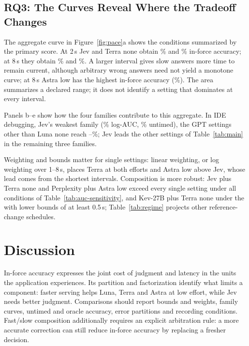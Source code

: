 \documentclass[11pt]{article}
\begin{document}
\subsection{RQ3: The Curves Reveal Where the Tradeoff Changes}
\label{sec:rq3}
The aggregate curve in Figure~\ref{fig:pace}a shows the conditions summarized by the primary score.
At 2\,s Jev and Terra none obtain \JevCommonTwo\% and \TerraNoneCommonTwo\% in-force accuracy; at 8\,s they obtain \JevCommonEight\% and \TerraNoneCommonEight\%.
A larger interval gives slow answers more time to remain current, although arbitrary wrong answers need not yield a monotone curve; at 8\,s Astra low has the highest in-force accuracy (\AstraCommonEight\%).
The area summarizes a declared range; it does not identify a setting that dominates at every interval.

Panels b--e show how the four families contribute to this aggregate.
In IDE debugging, Jev's weakest family (\JevDebugAuc\% log-AUC, \JevDebugUntimed\% untimed), the GPT settings other than Luna none reach \LunaDebugAuc--\TerraDebugAuc\%; Jev leads the other settings of Table~\ref{tab:main} in the remaining three families.

Weighting and bounds matter for single settings: linear weighting, or log weighting over 1--8\,s, places Terra at both efforts and Astra low above Jev, whose lead comes from the shortest intervals.
Composition is more robust: Jev plus Terra none and Perplexity plus Astra low exceed every single setting under all \LaterSensConditionsWord{} conditions of Table~\ref{tab:auc-sensitivity}, and Kev-27B plus Terra none under the \LaterSensKevTerraNoneAboveWord{} with lower bounds of at least 0.5\,s; Table~\ref{tab:regime} projects other reference-change schedules.

\section{Discussion}
\label{sec:discussion}

In-force accuracy expresses the joint cost of judgment and latency in the units the application experiences. Its partition and factorization identify what limits a component: faster serving helps Luna, Terra and Astra at low effort, while Jev needs better judgment.
Comparisons should report bounds and weights, family curves, untimed and oracle accuracy, error partitions and recording conditions. Fast/slow composition additionally requires an explicit arbitration rule: a more accurate correction can still reduce in-force accuracy by replacing a fresher decision.
\end{document}
